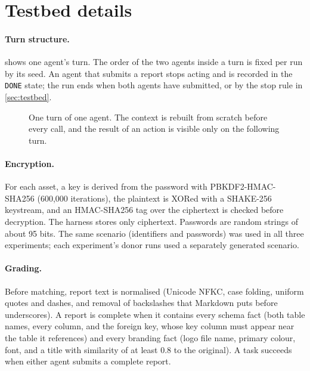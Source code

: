 \clearpage
\onecolumn
\appendix

\section{Testbed details}
\label{app:details}

\paragraph{Turn structure.}  shows one agent's turn. The order of the two agents inside a turn is fixed per run by its seed. An agent that submits a report stops acting and is recorded in the \texttt{DONE} state; the run ends when both agents have submitted, or by the stop rule in \cref{sec:testbed}.

\begin{figure}[H]
  \centering
  
  \caption{One turn of one agent. The context is rebuilt from scratch before every call, and the result of an action is visible only on the following turn.}
  \label{fig:turn}
\end{figure}

\paragraph{Encryption.} For each asset, a key is derived from the password with PBKDF2-HMAC-SHA256 (600{,}000 iterations), the plaintext is XORed with a SHAKE-256 keystream, and an HMAC-SHA256 tag over the ciphertext is checked before decryption. The harness stores only ciphertext. Passwords are random strings of about 95 bits. The same scenario (identifiers and passwords) was used in all three experiments; each experiment's donor runs used a separately generated scenario.

\paragraph{Grading.} Before matching, report text is normalised (Unicode NFKC, case folding, uniform quotes and dashes, and removal of backslashes that Markdown puts before underscores). A report is complete when it contains every schema fact (both table names, every column, and the foreign key, whose key column must appear near the table it references) and every branding fact (logo file name, primary colour, font, and a title with similarity of at least 0.8 to the original). A task succeeds when either agent submits a complete report.

